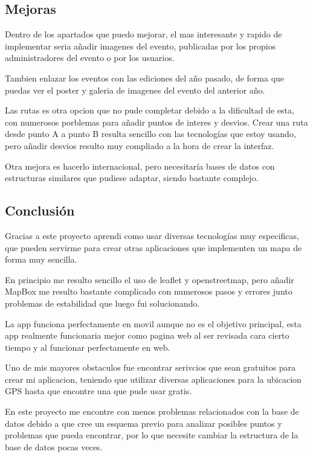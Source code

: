 \documentclass[a4paper, 11pt]{article}
\begin{document}
    \subsection{Mejoras}
    Dentro de los apartados que puedo mejorar, el mas interesante y rapido de implementar seria añadir imagenes del evento, publicadas por los propios administradores del evento o por los usuarios.


    Tambien enlazar los eventos con las ediciones del año pasado, de forma que puedas ver el poster y galeria de imagenes del evento del anterior año.


    Las rutas es otra opcion que no pude completar debido a la dificultad de esta, con numerosos porblemas para añadir puntos de interes y desvios. Crear una ruta desde punto A a punto B resulta sencillo con las tecnologías que 
    estoy usando, pero añadir desvios resulto muy compliado a la hora de crear la interfaz.


    Otra mejora es hacerlo internacional, pero necesitaría bases de datos con estructuras similares que pudiese adaptar, siendo bastante complejo.

\newpage
    \subsection{Conclusión}
    Gracias a este proyecto aprendi como usar diversas tecnologías muy especificas, que pueden servirme para crear otras aplicaciones que implementen un mapa de forma muy sencilla.
    
    En principio me resulto sencillo el uso de leaflet y openstreetmap, pero añadir MapBox me resulto bastante complicado con numerosos pasos y errores junto problemas de estabilidad que luego fui solucionando.

    La app funciona perfectamente en movil aunque no es el objetivo principal, esta app realmente funcionaria mejor como pagina web al ser revisada cara cierto tiempo y al funcionar perfectamente en web.  

    Uno de mis mayores obstaculos fue encontrar serivcios que sean gratuitos para crear mi aplicacion, teniendo que utilizar diversas aplicaciones para la ubicacion GPS hasta que encontre una que pude usar gratis.

    En este proyecto me encontre con menos problemas relacionados con la base de datos debido a que cree un esquema previo para analizar posibles puntos y problemas que pueda encontrar, por lo que necesite cambiar la estructura de la base de datos pocas veces.
    
\end{document}
